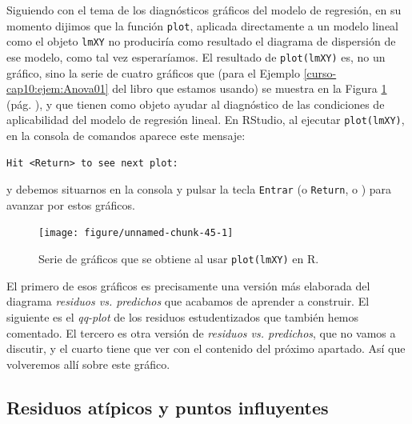 \documentclass[10pt,a4paper]{article}\usepackage[]{graphicx}\usepackage[]{color}
\newenvironment{knitrout}{}{} %
\newcounter {cont01}
\begin{document}
Siguiendo con el tema de los diagnósticos gráficos del modelo de regresión, en su momento dijimos que la función {\tt plot}, aplicada directamente a un modelo lineal como el objeto {\tt lmXY} no produciría como resultado el diagrama de dispersión de ese modelo, como tal vez esperaríamos. El resultado de {\tt plot(lmXY)} es, no un gráfico, sino la serie de cuatro gráficos que (para el Ejemplo \ref{curso-cap10:ejem:Anova01} del libro que estamos usando) se muestra en la Figura \ref{tut10:fig:GraficosDiagnosticoModeloLinealR} (pág. \pageref{tut10:fig:GraficosDiagnosticoModeloLinealR}), y que tienen como objeto ayudar al diagnóstico de las condiciones de aplicabilidad del modelo de regresión lineal. En RStudio, al ejecutar {\tt plot(lmXY)}, en la consola de comandos aparece este mensaje:
\begin{verbatim}
Hit <Return> to see next plot:
\end{verbatim}
y debemos situarnos en la consola y pulsar la tecla {\tt Entrar} (o {\tt Return}, o \Return) para avanzar por estos gráficos.
\begin{figure}[t]
\begin{center}
\begin{knitrout}
\color{fgcolor}
\texttt{[image: figure/unnamed-chunk-45-1]} 

\end{knitrout}
\end{center}
\caption{Serie de gráficos que se obtiene al usar {\tt plot(lmXY)} en R.}
\label{tut10:fig:GraficosDiagnosticoModeloLinealR}
\end{figure}


El primero de esos gráficos es precisamente una versión más elaborada del diagrama {\em residuos vs. predichos} que acabamos de aprender a construir. El siguiente es el {\em qq-plot} de los residuos estudentizados que también hemos comentado. El tercero es otra versión de {\em residuos vs. predichos}, que no vamos a discutir, y el cuarto tiene que ver con el contenido del próximo apartado. Así que volveremos allí sobre este gráfico.

\subsection{Residuos atípicos y puntos influyentes}
\end{document}
